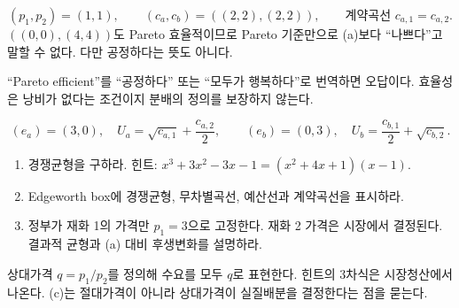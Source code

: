 \begin{answerbox}
\[
(p_1,p_2)=(1,1),\qquad (c_a,c_b)=((2,2),(2,2)),\qquad
\text{계약곡선 }c_{a,1}=c_{a,2}.
\]
$((0,0),(4,4))$도 Pareto 효율적이므로 Pareto 기준만으로 (a)보다 ``나쁘다''고 말할 수 없다. 다만 공정하다는 뜻도 아니다.
\end{answerbox}

\begin{warningbox}
``Pareto efficient''를 ``공정하다'' 또는 ``모두가 행복하다''로 번역하면 오답이다. 효율성은 낭비가 없다는 조건이지 분배의 정의를 보장하지 않는다.
\end{warningbox}

\begin{officialbox}
\[
(e_a)=(3,0),\quad U_a=\sqrt{c_{a,1}}+\frac{c_{a,2}}2,
\qquad
(e_b)=(0,3),\quad U_b=\frac{c_{b,1}}2+\sqrt{c_{b,2}}.
\]
\begin{enumerate}[label=(\alph*)]
\item 경쟁균형을 구하라. 힌트: $x^3+3x^2-3x-1=(x^2+4x+1)(x-1)$.
\item Edgeworth box에 경쟁균형, 무차별곡선, 예산선과 계약곡선을 표시하라.
\item 정부가 재화 1의 가격만 $p_1=3$으로 고정한다. 재화 2 가격은 시장에서 결정된다. 결과적 균형과 (a) 대비 후생변화를 설명하라.
\end{enumerate}
\end{officialbox}

\begin{strategybox}
상대가격 $q=p_1/p_2$를 정의해 수요를 모두 $q$로 표현한다. 힌트의 3차식은 시장청산에서 나온다. (c)는 절대가격이 아니라 상대가격이 실질배분을 결정한다는 점을 묻는다.
\end{strategybox}

